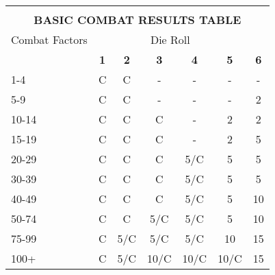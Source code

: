   \begin{tabular}{|lcccccc|}
    \hline & & & & & &\\[-3.0ex]
    \multicolumn{7}{|c|}{\textbf{BASIC COMBAT RESULTS TABLE}}\\
    Combat Factors & \multicolumn{5}{c}{Die Roll} &\\
    & \textbf{1} & \textbf{2} & \textbf{3} & \textbf{4} & \textbf{5} & \textbf{6}\\
    1-4 & C & C & - & - & - & -\\
    5-9 & C & C & - & - & - & 2\\
    10-14 & C & C & C & - & 2 & 2\\
    15-19 & C & C & C & - & 2 & 5\\
    20-29 & C & C & C & 5/C & 5 & 5\\
    30-39 & C & C & C & 5/C & 5 & 5\\
    40-49 & C & C & C & 5/C & 5 & 10\\
    50-74 & C & C & 5/C & 5/C & 5 & 10\\
    75-99 & C & 5/C & 5/C & 5/C & 10 & 15\\
    100+ & C & 5/C & 10/C & 10/C & 10/C & 15\\
    \hline
  \end{tabular}